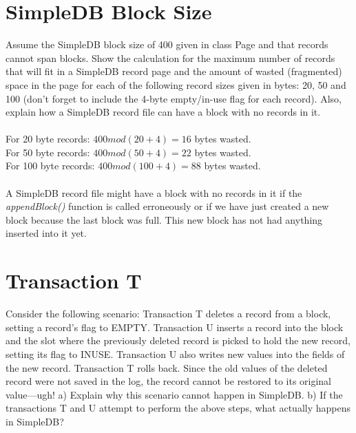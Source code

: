 \documentclass [letter,12pt] {article}
\begin{document}
\section{SimpleDB Block Size}
    Assume the SimpleDB block size of 400 given in class Page and that records
    cannot span blocks. Show the calculation for the maximum number of records
    that will fit in a SimpleDB record page and the amount of wasted 
    (fragmented) space in the page for each of the following record sizes
    given in bytes: 20, 50 and 100 (don’t forget to include the 4-byte 
    empty/in-use flag for each record). Also, explain how a SimpleDB record 
    file can have a block with no records in it.
    \\
    \\
    For 20 byte records: \(400 mod(20 + 4)=16\) bytes wasted.\\
    For 50 byte records: \(400 mod(50 + 4)=22\) bytes wasted.\\
    For 100 byte records: \(400 mod(100 + 4)=88\) bytes wasted.\\
    \\
    A SimpleDB record file might have a block with no records in it if
    the \textit{appendBlock()} function is called erroneously or if we
    have just created a new block because the last block was full. 
    This new block has not had anything inserted into it yet.


\section{Transaction T}
    Consider the following scenario: Transaction T deletes a record from a
    block, setting a record’s flag to EMPTY. Transaction U inserts a 
    record into the block and the slot where the previously deleted 
    record is picked to hold the new record, setting its flag to INUSE. 
    Transaction U also writes new values into the fields of the new record. 
    Transaction T rolls back. Since the old values of the deleted record 
    were not saved in the log, the record cannot be restored to its original 
    value—ugh! a) Explain why this scenario cannot happen in SimpleDB. 
    b) If the transactions T and U attempt to perform the above steps, what 
    actually happens in SimpleDB?
\end{document}
